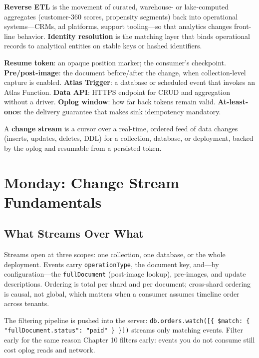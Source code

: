 \begin{definitionbox}
\textbf{Reverse ETL} is the movement of curated, warehouse- or lake-computed aggregates (customer-360 scores, propensity segments) back into operational systems---CRMs, ad platforms, support tooling---so that analytics changes front-line behavior. \textbf{Identity resolution} is the matching layer that binds operational records to analytical entities on stable keys or hashed identifiers.
\end{definitionbox}

\begin{keyterms}
\textbf{Resume token}: an opaque position marker; the consumer's checkpoint. \textbf{Pre/post-image}: the document before/after the change, when collection-level capture is enabled. \textbf{Atlas Trigger}: a database or scheduled event that invokes an Atlas Function. \textbf{Data API}: HTTPS endpoint for CRUD and aggregation without a driver. \textbf{Oplog window}: how far back tokens remain valid. \textbf{At-least-once}: the delivery guarantee that makes sink idempotency mandatory.
\end{keyterms}

\begin{definitionbox}
A \textbf{change stream} is a cursor over a real-time, ordered feed of data changes (inserts, updates, deletes, DDL) for a collection, database, or deployment, backed by the oplog and resumable from a persisted token.
\end{definitionbox}

\section{Monday: Change Stream Fundamentals}
\subsection{What Streams Over What}
Streams open at three scopes: one collection, one database, or the whole deployment. Events carry \texttt{operationType}, the document key, and---by configuration---the \texttt{fullDocument} (post-image lookup), pre-images, and update descriptions. Ordering is total per shard and per document; cross-shard ordering is causal, not global, which matters when a consumer assumes timeline order across tenants.

The filtering pipeline is pushed into the server: \texttt{db.orders.watch([\{ \$match: \{ "fullDocument.status": "paid" \} \}])} streams only matching events. Filter early for the same reason Chapter 10 filters early: events you do not consume still cost oplog reads and network.

